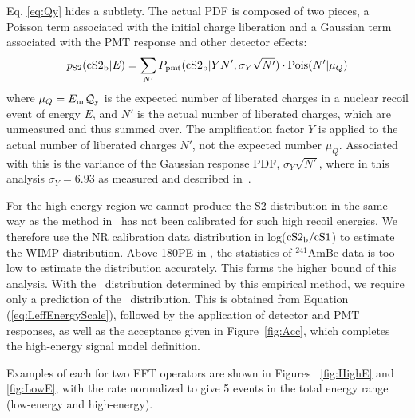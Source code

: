 Eq. \ref{eq:Qy} hides a subtlety. The actual \cSiib PDF is composed of two pieces, a Poisson term associated with the initial charge liberation and a Gaussian term associated with the PMT response and other detector effects:
%
\begin{equation}
\label{eq.cS2pdf}
p_\mathrm{S2}(\mathrm{\mathrm{cS2}_\mathrm{b}}|E) = \sum_{N'} P_\mathrm{pmt}(\mathrm{\mathrm{cS2}_\mathrm{b}}|Y N',\sigma_Y \sqrt{N'})\cdot\mathrm{Pois}(N'|\mu_Q)
\end{equation}
%
where $\mu_Q=E_{\mathrm{nr}}\mathcal{Q}_{\mathrm{y}}$ is the expected number of liberated charges in a nuclear recoil event of energy $E$, and $N'$ is the actual number of liberated charges, which are unmeasured and thus summed over. The amplification factor $Y$ is applied to the actual number of liberated charges $N'$, not the expected number $\mu_Q$. Associated with this is the variance of the Gaussian response PDF, $\sigma_Y\sqrt{N'}$, where in this analysis $\sigma_Y = 6.93$ as measured and described in~\cite{XenonSingleElectron}. 

For the high energy region we cannot produce the S2 distribution in the same way as the method in~\cite{DataMCXenon} has not been calibrated for such high recoil energies. We therefore use the NR calibration data distribution in log($\mathrm{\mathrm{cS2}_\mathrm{b}/\mathrm{cS1}}$) to estimate the WIMP distribution. Above 180PE in \cSi, the statistics of $^{241}$AmBe data is too low to estimate the distribution accurately. This forms the higher bound of this analysis. With the \cSiib\ distribution determined by this empirical method, we require only a prediction of the \cSi\ distribution. This is obtained from Equation (\ref{eq:LeffEnergyScale}), followed by the application of detector and PMT responses, as well as the acceptance given in Figure~\ref{fig:Acc}, which completes the high-energy signal model definition.

Examples of each for two EFT operators are shown in Figures ~\ref{fig:HighE} and \ref{fig:LowE}, with the rate normalized to give 5 events in the total energy range (low-energy and high-energy).

